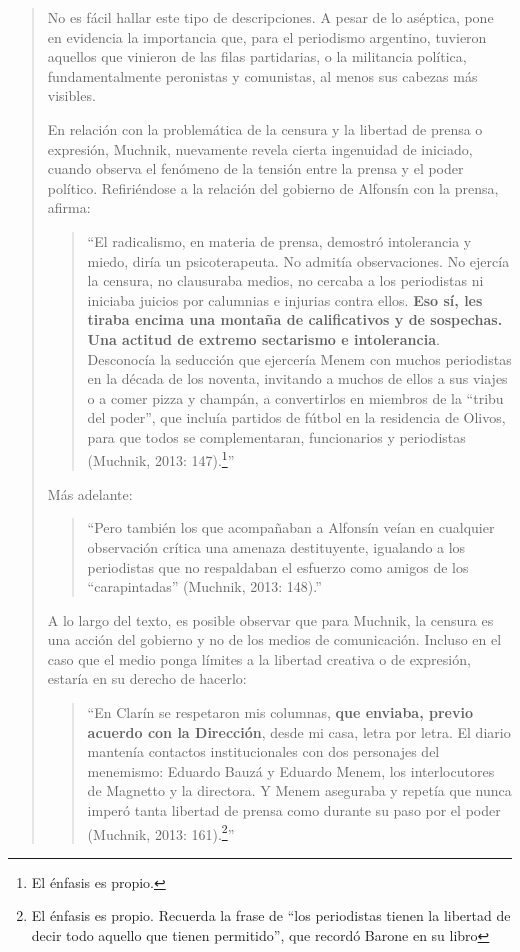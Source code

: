 \begin{quote}
No es fácil hallar este tipo de descripciones. A pesar de lo aséptica, pone en evidencia la importancia que, para el periodismo argentino, tuvieron aquellos que vinieron de las filas partidarias, o la militancia política, fundamentalmente peronistas y comunistas, al menos sus cabezas más visibles.

En relación con la problemática de la censura y la libertad de prensa o expresión, Muchnik, nuevamente revela cierta ingenuidad de iniciado, cuando observa el fenómeno de la tensión entre la prensa y el poder político. Refiriéndose a la relación del gobierno de Alfonsín con la prensa, afirma:

\begin{quote}
	\enquote{El radicalismo, en materia de prensa, demostró intolerancia y miedo, diría un psicoterapeuta. No admitía observaciones. No ejercía la censura, no clausuraba medios, no cercaba a los periodistas ni iniciaba juicios por calumnias e injurias contra ellos. \textbf{Eso sí, les tiraba encima una montaña de calificativos y de sospechas. Una actitud de extremo sectarismo e intolerancia}. Desconocía la seducción que ejercería Menem con muchos periodistas en la década de los noventa, invitando a muchos de ellos a sus viajes o a comer pizza y champán, a convertirlos en miembros de la ``tribu del poder'', que incluía partidos de fútbol en la residencia de Olivos, para que todos se complementaran, funcionarios y periodistas (Muchnik, 2013: 147).\footnote{El énfasis es propio.}}
\end{quote}


Más adelante:

\begin{quote}
	\enquote{Pero también los que acompañaban a Alfonsín veían en cualquier observación crítica una amenaza destituyente, igualando a los periodistas que no respaldaban el esfuerzo como amigos de los ``carapintadas'' (Muchnik, 2013: 148).}
\end{quote}

A lo largo del texto, es posible observar que para Muchnik, la censura es una acción del gobierno y no de los medios de comunicación. Incluso en el caso que el medio ponga límites a la libertad creativa o de expresión, estaría en su derecho de hacerlo:

\begin{quote}
	\enquote{En Clarín se respetaron mis columnas, \textbf{que enviaba, previo acuerdo con la Dirección}, desde mi casa, letra por letra. El diario mantenía contactos institucionales con dos personajes del menemismo: Eduardo Bauzá y Eduardo Menem, los interlocutores de Magnetto y la directora. Y Menem aseguraba y repetía que nunca imperó tanta libertad de prensa como durante su paso por el poder (Muchnik, 2013: 161).\footnote{El énfasis es propio. Recuerda la frase de “los periodistas tienen la libertad de decir todo aquello que tienen permitido”, que recordó Barone en su libro}}
\end{quote}



\end{quote}
